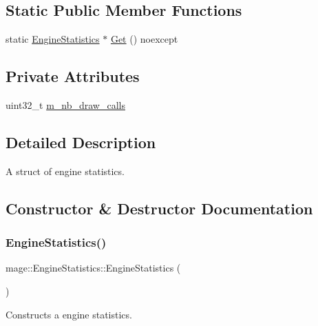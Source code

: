 \subsection*{Static Public Member Functions}
\begin{DoxyCompactItemize}
\item 
static \hyperlink{structmage_1_1_engine_statistics}{Engine\+Statistics} $\ast$ \hyperlink{structmage_1_1_engine_statistics_a7eb0d3a988676f71eea8e9f26ab07f42}{Get} () noexcept
\end{DoxyCompactItemize}
\subsection*{Private Attributes}
\begin{DoxyCompactItemize}
\item 
uint32\+\_\+t \hyperlink{structmage_1_1_engine_statistics_a6667673ee9eb691c09d4c14eccef7657}{m\+\_\+nb\+\_\+draw\+\_\+calls}
\end{DoxyCompactItemize}


\subsection{Detailed Description}
A struct of engine statistics. 

\subsection{Constructor \& Destructor Documentation}
\hypertarget{structmage_1_1_engine_statistics_acbaa39e0e0ee0d6cb5c8d174bb80a3fd}{}\label{structmage_1_1_engine_statistics_acbaa39e0e0ee0d6cb5c8d174bb80a3fd} 
\subsubsection{\texorpdfstring{Engine\+Statistics()}{EngineStatistics()}\hspace{0.1cm}{\footnotesize\ttfamily [1/3]}}
{\footnotesize\ttfamily mage\+::\+Engine\+Statistics\+::\+Engine\+Statistics (\begin{DoxyParamCaption}{ }\end{DoxyParamCaption})}

Constructs a engine statistics. \hypertarget{structmage_1_1_engine_statistics_a8361fa991298c7669b4e3c8262acff60}{}\label{structmage_1_1_engine_statistics_a8361fa991298c7669b4e3c8262acff60} 
